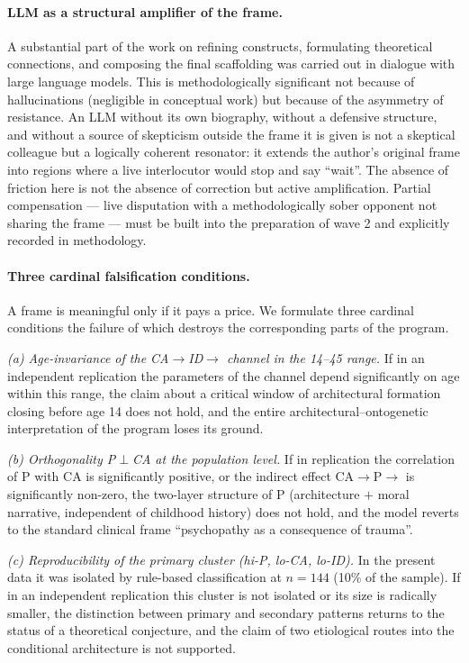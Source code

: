 \paragraph{LLM as a structural amplifier of the frame.} A substantial part of the work on refining constructs, formulating theoretical connections, and composing the final scaffolding was carried out in dialogue with large language models. This is methodologically significant not because of hallucinations (negligible in conceptual work) but because of the asymmetry of resistance. An LLM without its own biography, without a defensive structure, and without a source of skepticism outside the frame it is given is not a skeptical colleague but a logically coherent resonator: it extends the author's original frame into regions where a live interlocutor would stop and say ``wait''. The absence of friction here is not the absence of correction but active amplification. Partial compensation --- live disputation with a methodologically sober opponent not sharing the frame --- must be built into the preparation of wave 2 and explicitly recorded in methodology.

\paragraph{Three cardinal falsification conditions.} A frame is meaningful only if it pays a price. We formulate three cardinal conditions the failure of which destroys the corresponding parts of the program.

\emph{(a) Age-invariance of the CA$\to$ID$\to$\EAF{} channel in the 14--45 range.} If in an independent replication the parameters of the channel depend significantly on age within this range, the claim about a critical window of architectural formation closing before age 14 does not hold, and the entire architectural--ontogenetic interpretation of the program loses its ground.

\emph{(b) Orthogonality P$\perp$CA at the population level.} If in replication the correlation of P with CA is significantly positive, or the indirect effect CA$\to$P$\to$\EAF{} is significantly non-zero, the two-layer structure of P (architecture $+$ moral narrative, independent of childhood history) does not hold, and the model reverts to the standard clinical frame ``psychopathy as a consequence of trauma''.

\emph{(c) Reproducibility of the primary cluster (hi-P, lo-CA, lo-ID).} In the present data it was isolated by rule-based classification at $n = 144$ (10\% of the sample). If in an independent replication this cluster is not isolated or its size is radically smaller, the distinction between primary and secondary patterns returns to the status of a theoretical conjecture, and the claim of two etiological routes into the conditional architecture is not supported.

